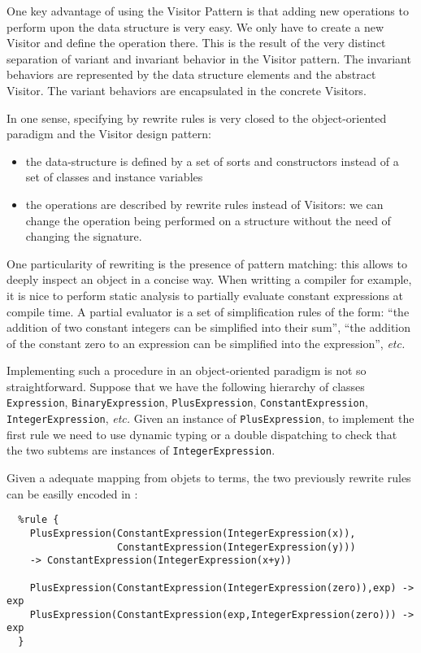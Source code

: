 One key advantage of using the Visitor Pattern is that adding new
operations to perform upon the data structure is very easy. 
We only have to create a new Visitor and define the operation there.
This is the result of the very distinct separation of variant and
invariant behavior in the Visitor pattern.   
The invariant behaviors are represented by the data structure elements
and the abstract Visitor. The variant behaviors are encapsulated in
the concrete Visitors. 

In one sense, specifying by rewrite rules is very closed to the
object-oriented paradigm and the Visitor design pattern:  
\begin{itemize}
\item the data-structure is defined by a set of sorts and constructors 
  instead of a set of classes and instance variables
\item the operations are described by rewrite rules instead of
  Visitors: we can change the operation being performed on a structure
  without the need of changing the signature.
\end{itemize}

One particularity of rewriting is the presence of pattern matching:
this allows to deeply inspect an object in a concise way.
When writting a compiler for example, it is nice to perform static
analysis to partially evaluate constant expressions at compile time.
A partial evaluator is a set of simplification rules of the form:
``the addition of two constant integers can be simplified into their
sum'', ``the addition of the constant zero to an expression can be
simplified into the expression'', \textit{etc.} 

Implementing such a procedure in an object-oriented paradigm is not so
straightforward. Suppose that we have the following hierarchy of classes
\texttt{Expression}, \texttt{BinaryExpression},
\texttt{PlusExpression}, \texttt{ConstantExpression},
\texttt{IntegerExpression}, \textit{etc.} 
Given an instance of \texttt{PlusExpression}, to implement the first
rule we need to use dynamic typing or a double dispatching to check
that the two subtems are instances of \texttt{IntegerExpression}. 

Given a adequate mapping from objets to terms, the two previously
rewrite rules can be easilly encoded in \TOM:
\begin{verbatim}
  %rule {
    PlusExpression(ConstantExpression(IntegerExpression(x)),
                   ConstantExpression(IntegerExpression(y)))
    -> ConstantExpression(IntegerExpression(x+y))

    PlusExpression(ConstantExpression(IntegerExpression(zero)),exp) -> exp
    PlusExpression(ConstantExpression(exp,IntegerExpression(zero))) -> exp
  }
\end{verbatim}


